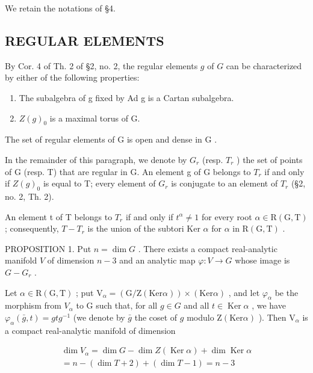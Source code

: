 We retain the notations of §4.

\subsection{REGULAR ELEMENTS}

By Cor. 4 of Th. 2 of §2, no. 2, the regular elements \(g\) of \(G\) can be characterized by either of the following properties:

\begin{enumerate}
\def\labelenumi{\alph{enumi})}
\item
  The subalgebra of g fixed by Ad g is a Cartan subalgebra.
\item
  \(Z(g)_{0}\) is a maximal torus of G.
\end{enumerate}

The set of regular elements of \(\mathrm{G}\) is open and dense in \(\mathrm{G}\) .

In the remainder of this paragraph, we denote by \(G_{r}\) (resp. \(T_{r}\) ) the set of points of G (resp. T) that are regular in G. An element g of G belongs to \(T_{r}\) if and only if \(Z(g)_{0}\) is equal to T; every element of \(G_{r}\) is conjugate to an element of \(T_{r}\) (§2, no. 2, Th. 2).

An element t of T belongs to \(T_{r}\) if and only if \(t^{\alpha} \neq 1\) for every root \(\alpha \in \mathrm{R}(\mathrm{G}, \mathrm{T})\) ; consequently, \(T - T_{r}\) is the union of the subtori Ker \(\alpha\) for \(\alpha\) in \(\mathrm{R}(\mathrm{G}, \mathrm{T})\) .

PROPOSITION 1. Put \(n = \dim G\) . There exists a compact real-analytic manifold \(V\) of dimension \(n - 3\) and an analytic map \(\varphi : V \to G\) whose image is \(G - G_r\) .

Let \(\alpha\in\mathrm{R}(\mathrm{G},\mathrm{T})\) ; put \(\mathrm{V}_{\alpha}=(\mathrm{G}/\mathrm{Z}(\mathrm{Ker}\alpha))\times(\mathrm{Ker}\alpha)\) , and let \(\varphi_{\alpha}\) be the morphism from \(V_{\alpha}\) to G such that, for all \(g\in G\) and all \(t\in\operatorname{Ker}\alpha\) , we have \(\varphi_{\alpha}(\bar{g},t) = gtg^{-1}\) (we denote by \(\bar{g}\) the coset of \(g\) modulo \(\mathrm{Z}(\mathrm{Ker}\alpha)\) ). Then \(\mathrm{V}_{\alpha}\) is a compact real-analytic manifold of dimension

\[
\begin{array}{c} \dim V _ {\alpha} = \dim G - \dim Z (\operatorname{Ker} \alpha) + \dim \operatorname{Ker} \alpha \\ = n - (\dim T + 2) + (\dim T - 1) = n - 3 \end{array}
\]

